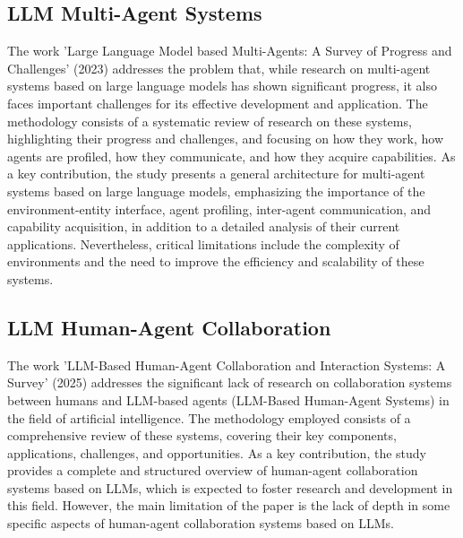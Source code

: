 \subsection{LLM Multi-Agent Systems}
The work 'Large Language Model based Multi-Agents: A Survey of Progress and Challenges' \cite{ref-2} (2023) addresses the problem that, while research on multi-agent systems based on large language models has shown significant progress, it also faces important challenges for its effective development and application. The methodology consists of a systematic review of research on these systems, highlighting their progress and challenges, and focusing on how they work, how agents are profiled, how they communicate, and how they acquire capabilities. As a key contribution, the study presents a general architecture for multi-agent systems based on large language models, emphasizing the importance of the environment-entity interface, agent profiling, inter-agent communication, and capability acquisition, in addition to a detailed analysis of their current applications. Nevertheless, critical limitations include the complexity of environments and the need to improve the efficiency and scalability of these systems.

\subsection{LLM Human-Agent Collaboration}
The work 'LLM-Based Human-Agent Collaboration and Interaction Systems: A Survey' \cite{ref-5} (2025) addresses the significant lack of research on collaboration systems between humans and LLM-based agents (LLM-Based Human-Agent Systems) in the field of artificial intelligence. The methodology employed consists of a comprehensive review of these systems, covering their key components, applications, challenges, and opportunities. As a key contribution, the study provides a complete and structured overview of human-agent collaboration systems based on LLMs, which is expected to foster research and development in this field. However, the main limitation of the paper is the lack of depth in some specific aspects of human-agent collaboration systems based on LLMs.

